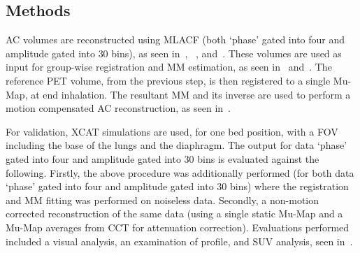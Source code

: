         \subsection{Methods} \label{sec:pet_ct_motion_correction_exploiting_motion_models_fit_on_coarsely_gated_data_applied_to_finely_gated_data_methods}
            \gls{AC} volumes are reconstructed using \gls{MLACF} (both `phase' gated into four and amplitude gated into $30$ bins), as seen in~, ~, and~. These volumes are used as input for group-wise registration and \gls{MM} estimation, as seen in~ and~. The reference \gls{PET} volume, from the previous step, is then registered to a single \gls{Mu-Map}, at end inhalation. The resultant \gls{MM} and its inverse are used to perform a motion compensated \gls{AC} reconstruction, as seen in~.
            
            For validation, \gls{XCAT} simulations are used, for one bed position, with a \gls{FOV} including the base of the lungs and the diaphragm. The output for data `phase' gated into four and amplitude gated into $30$ bins is evaluated against the following. Firstly, the above procedure was additionally performed (for both data `phase' gated into four and amplitude gated into $30$ bins) where the registration and \gls{MM} fitting was performed on noiseless data. Secondly, a non-motion corrected reconstruction of the same data (using a single static \gls{Mu-Map} and a \gls{Mu-Map} averages from \gls{CCT} for attenuation correction). Evaluations performed included a visual analysis, an examination of profile, and \gls{SUV} analysis, seen in~.
            
